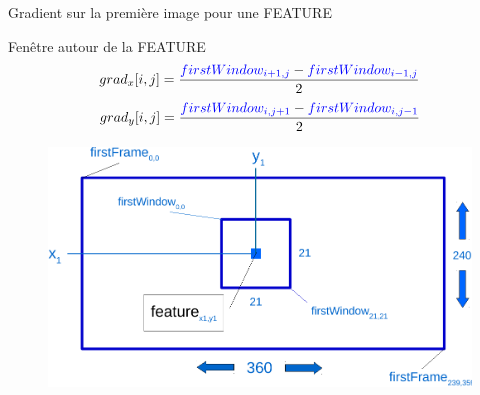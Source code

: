 \documentclass{bredelebeamer}
\begin{document}

\begin{frame}{Gradient sur la première image pour une FEATURE}

	\begin{block}{Fen\^etre autour de la FEATURE}
 $$grad_{x}[i,j] = \frac{\textcolor{blue}{firstWindow_{i+1,j}} - \textcolor{blue}{firstWindow_{i-1,j}}}{2}$$
 $$grad_{y}[i,j] = \frac{\textcolor{blue}{firstWindow_{i,j+1}} - \textcolor{blue}{firstWindow_{i,j-1}}}{2}$$
\end{block}

\begin{figure}
\centering
\includegraphics[scale=0.3]{images/firstFrameWindow.pdf}
\end{figure}

\end{frame}

\end{document}
